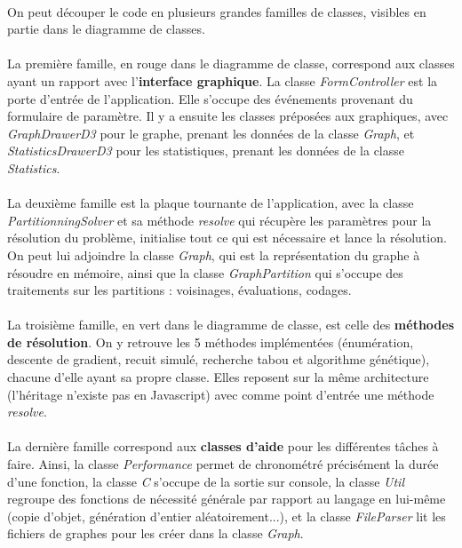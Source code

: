 \documentclass[12pt]{article}
\begin{document}
\paragraph{}On peut découper le code en plusieurs grandes familles de classes, visibles en partie dans le diagramme de classes.

\paragraph{}La première famille, en rouge dans le diagramme de classe, correspond aux classes ayant un rapport avec l'\textbf{interface graphique}. La classe \textit{FormController} est la porte d'entrée de l'application. Elle s'occupe des événements provenant du formulaire de paramètre. Il y a ensuite les classes préposées aux graphiques, avec \textit{GraphDrawerD3} pour le graphe, prenant les données de la classe \textit{Graph}, et \textit{StatisticsDrawerD3} pour les statistiques, prenant les données de la classe \textit{Statistics}.

\paragraph{}La deuxième famille est la plaque tournante de l'application, avec la classe \textit{PartitionningSolver} et sa méthode \textit{resolve} qui récupère les paramètres pour la résolution du problème, initialise tout ce qui est nécessaire et lance la résolution. On peut lui adjoindre la classe \textit{Graph}, qui est la représentation du graphe à résoudre en mémoire, ainsi que la classe \textit{GraphPartition} qui s'occupe des traitements sur les partitions : voisinages, évaluations, codages.

\paragraph{}La troisième famille, en vert dans le diagramme de classe, est celle des \textbf{méthodes de résolution}. On y retrouve les 5 méthodes implémentées (énumération, descente de gradient, recuit simulé, recherche tabou et algorithme génétique), chacune d'elle ayant sa propre classe. Elles reposent sur la même architecture (l'héritage n'existe pas en Javascript) avec comme point d'entrée une méthode \textit{resolve}.

\paragraph{}La dernière famille correspond aux \textbf{classes d'aide} pour les différentes tâches à faire. Ainsi, la classe \textit{Performance} permet de chronométré précisément la durée d'une fonction, la classe \textit{C} s'occupe de la sortie sur console, la classe \textit{Util} regroupe des fonctions de nécessité générale par rapport au langage en lui-même (copie d'objet, génération d'entier aléatoirement...), et la classe \textit{FileParser} lit les fichiers de graphes pour les créer dans la classe \textit{Graph}.
\end{document}
